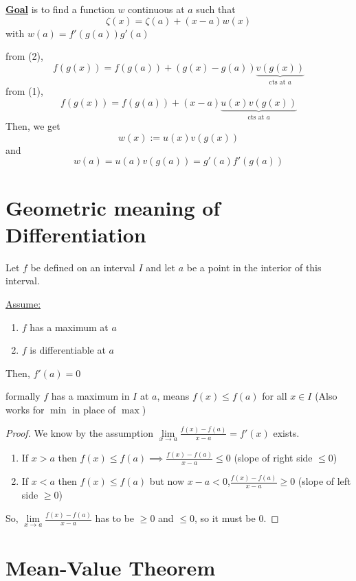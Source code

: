 \underline{\textbf{Goal}} is to find a function $w$ continuous at $a$ such that 
$$\zeta(x) = \zeta(a) + (x - a)w(x)$$
with $w(a) = f'(g(a))g'(a)$

from (2), $$f(g(x)) = f(g(a)) + (g(x) - g(a))\underbrace{v(g(x))}_{\text{cts at }a}$$
from (1), $$f(g(x)) = f(g(a)) + (x-a)\underbrace{u(x)v(g(x))}_{\text{cts at }a}$$
Then, we get 
$$w(x):= u(x)v(g(x))$$
and
$$w(a) = u(a)v(g(a)) = g'(a)f'(g(a))$$

\section{Geometric meaning of Differentiation}

\begin{theorem*}
  Let $f$ be defined on an interval $I$ and let $a$ be a point in the interior of this interval.

  \underline{Assume:}
  \begin{enumerate}
    \item $f$ has a maximum at $a$
    \item $f$ is differentiable at $a$
  \end{enumerate}
  Then, $f'(a) = 0$ 
  
  formally $f$ has a maximum in $I$ at $a$, means $f(x) \leq f(a)$ for all $x \in I$
  (Also works for $\min$ in place of $\max$)
\end{theorem*}

\begin{proof}
  We know by the assumption $\lim\limits_{x\to a} \frac{f(x) - f(a)}{x - a} = f'(x)$ exists.

  \begin{enumerate}
    \item If $x > a$ then $f(x) \leq f(a) \implies \frac{f(x) - f(a)}{x - a} \leq 0$ (slope of right side $\leq 0$)
    \item If $x < a$ then $f(x) \leq f(a)$ but now $x - a < 0$,$ \frac{f(x) - f(a)}{x - a} \geq 0$ (slope of left side $\geq 0$)
  \end{enumerate}

  So, $\lim\limits_{x\to a} \frac{f(x) - f(a)}{x - a}$ has to be $\geq 0$ and $\leq 0$, so it must be $0$.

\end{proof}

\section{Mean-Value Theorem}

